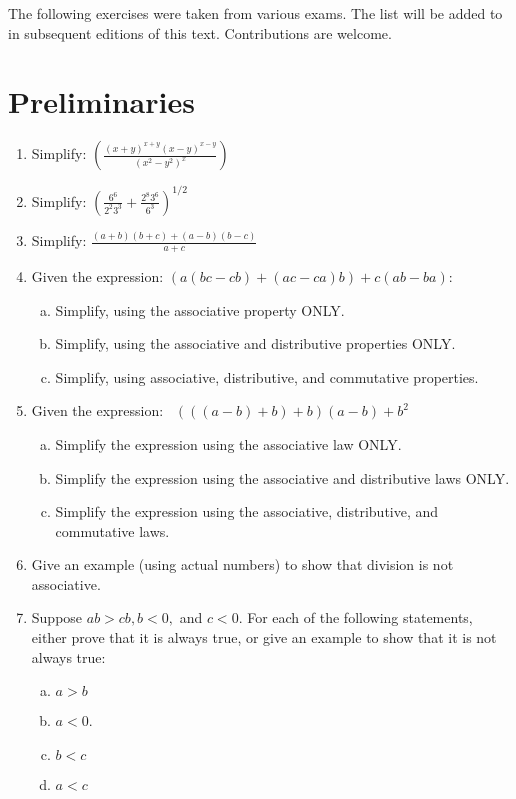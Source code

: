 
The following exercises were taken from various exams. The list will be added to in subsequent editions of this text.  Contributions are welcome.


\section{Preliminaries}
\begin{enumerate}[(1)]
\item
Simplify:
$\displaystyle{ \left(\frac{(x+y)^{x+y}(x-y)^{x-y}}{(x^2 - y^2)^x}\right)}$
\item
Simplify:
$ \displaystyle{\left( \frac{6^6}{2^2 3^3} +  \frac{2^8 3^6}{6^3}\right)^{1/2}} $
\item
Simplify:   $ \displaystyle{\frac{(a+b)(b+c) + (a-b)(b-c)}{a+c} }$
\item
Given the expression:  $( a(bc - cb) + (ac - ca)b) + c(ab - ba)$:
\begin{enumerate}[(a)]
\item
Simplify, using the associative property ONLY.
\item
Simplify, using the associative and distributive properties ONLY.
\item
Simplify, using associative, distributive, and commutative properties.
\end{enumerate}

\item
Given the expression:~
 $(((a-b)+b)+b)(a-b) + b^2$
\begin{enumerate}[(a)]
\item
Simplify the expression using the associative law ONLY.
\item
Simplify the expression using the associative and distributive laws ONLY.
\item
Simplify the expression using the associative, distributive, and commutative laws.
\end{enumerate}

\item
Give an example (using actual numbers) to show that division is not associative.
\item
Suppose $ab>cb, b < 0,$ and $c<0$.  For each of the following statements, either prove that it is always true, or give an example to show that
it is not always true:
\begin{enumerate}[(a)]
\item
$a > b$ \qquad 
\item
$a < 0$.
\item
$b < c$ \qquad 
\item
$a < c$ \qquad 
\end{enumerate}

\end{enumerate}

